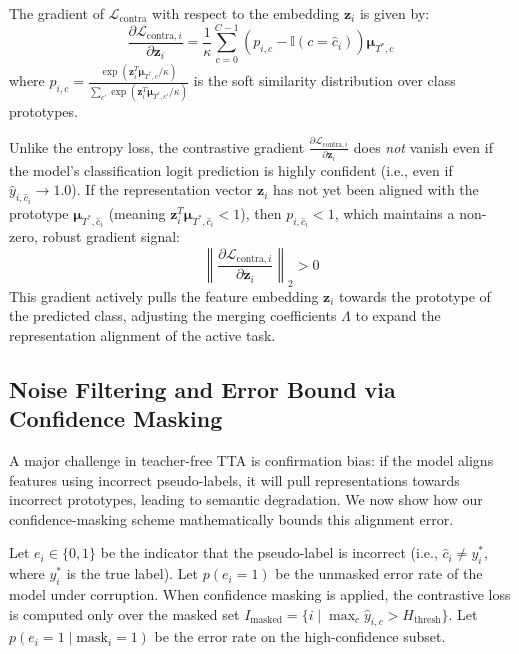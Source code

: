 \documentclass{article}
\theoremstyle{plain}
\theoremstyle{definition}
\theoremstyle{remark}
\begin{document}
The gradient of $\mathcal{L}_{\text{contra}}$ with respect to the embedding $\mathbf{z}_i$ is given by:
\begin{equation}
    \frac{\partial \mathcal{L}_{\text{contra}, i}}{\partial \mathbf{z}_i} = \frac{1}{\kappa} \sum_{c=0}^{C-1} \left( p_{i, c} - \mathbb{I}(c = \hat{c}_i) \right) \mathbf{\mu}_{T^*, c}
\end{equation}
where $p_{i, c} = \frac{\exp(\mathbf{z}_i^T \mathbf{\mu}_{T^*, c} / \kappa)}{\sum_{c'} \exp(\mathbf{z}_i^T \mathbf{\mu}_{T^*, c'} / \kappa)}$ is the soft similarity distribution over class prototypes.

Unlike the entropy loss, the contrastive gradient $\frac{\partial \mathcal{L}_{\text{contra}, i}}{\partial \mathbf{z}_i}$ does \emph{not} vanish even if the model's classification logit prediction is highly confident (i.e., even if $\hat{y}_{i, \hat{c}_i} \to 1.0$). If the representation vector $\mathbf{z}_i$ has not yet been aligned with the prototype $\mathbf{\mu}_{T^*, \hat{c}_i}$ (meaning $\mathbf{z}_i^T \mathbf{\mu}_{T^*, \hat{c}_i} < 1$), then $p_{i, \hat{c}_i} < 1$, which maintains a non-zero, robust gradient signal:
\begin{equation}
    \left\| \frac{\partial \mathcal{L}_{\text{contra}, i}}{\partial \mathbf{z}_i} \right\|_2 > 0
\end{equation}
This gradient actively pulls the feature embedding $\mathbf{z}_i$ towards the prototype of the predicted class, adjusting the merging coefficients $\Lambda$ to expand the representation alignment of the active task.

\subsection{Noise Filtering and Error Bound via Confidence Masking}
A major challenge in teacher-free TTA is confirmation bias: if the model aligns features using incorrect pseudo-labels, it will pull representations towards incorrect prototypes, leading to semantic degradation. We now show how our confidence-masking scheme mathematically bounds this alignment error.

Let $e_i \in \{0, 1\}$ be the indicator that the pseudo-label is incorrect (i.e., $\hat{c}_i \neq y_i^*$, where $y_i^*$ is the true label). Let $p(e_i = 1)$ be the unmasked error rate of the model under corruption.
When confidence masking is applied, the contrastive loss is computed only over the masked set $I_{\text{masked}} = \{i \mid \max_c \hat{y}_{i, c} > H_{\text{thresh}}\}$. Let $p(e_i = 1 \mid \text{mask}_i = 1)$ be the error rate on the high-confidence subset.
\end{document}
